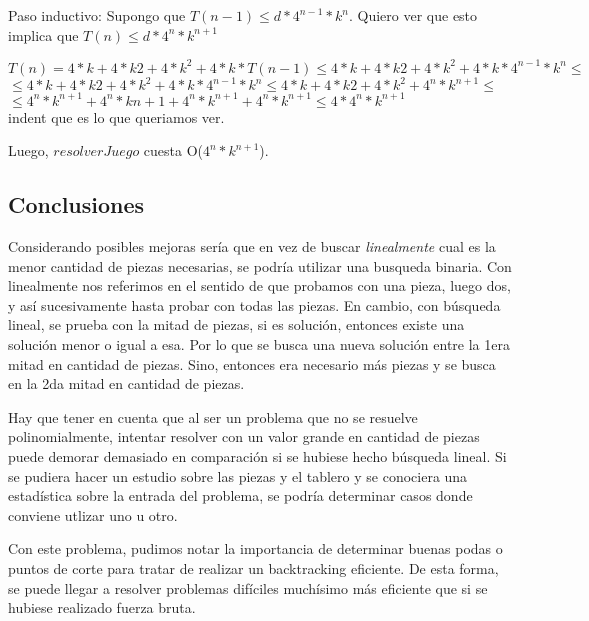 \indent Paso inductivo: Supongo  que $T(n-1) \leq  d * 4^{n-1}* k^{n}$. Quiero ver que esto implica que  $T(n) \leq  d * 4^{n}* k^{n+1}$\\

\begin{center}

\indent $T(n)= 4*k + 4*k{2} + 4*k^{2} + 4*k * T(n-1) \leq 4*k + 4*k{2} + 4*k^{2} + 4*k * 4^{n-1}* k^{n} \leq $\\
\indent $\leq 4*k + 4*k{2} + 4*k^{2} + 4*k * 4^{n-1}* k^{n} \leq 4*k + 4*k{2} + 4*k^{2} + 4^{n}* k^{n+1} \leq $ \\
\indent $\leq 4^{n}*k^{n+1} + 4^{n}*k{n+1} + 4^{n}*k^{n+1} + 4^{n}* k^{n+1} \leq 4* 4^{n}* k^{n+1}$\\
indent que es lo que queriamos ver.\\
\end{center}


\indent Luego, $resolverJuego$ cuesta O($4^{n}*k^{n+1}$).\\


\subsection{Conclusiones}

\quad Considerando posibles mejoras ser\'ia que en vez de buscar \textit{linealmente} cual es la menor cantidad de piezas necesarias, se podr\'ia utilizar una busqueda binaria. Con linealmente nos referimos en el sentido de que probamos con una pieza, luego dos, y así sucesivamente hasta probar con todas las piezas. En cambio, con b\'usqueda lineal, se prueba con la mitad de piezas, si es soluci\'on, entonces existe una soluci\'on menor o igual a esa. Por lo que se busca una nueva soluci\'on entre la 1era mitad en cantidad de piezas. Sino, entonces era necesario m\'as piezas y se busca en la 2da mitad en cantidad de piezas.

\quad Hay que tener en cuenta que al ser un problema que no se resuelve polinomialmente, intentar resolver con un valor grande en cantidad de piezas puede demorar demasiado en comparaci\'on si se hubiese hecho b\'usqueda lineal. Si se pudiera hacer un estudio sobre las piezas y el tablero y se conociera una estad\'istica sobre la entrada del problema, se podr\'ia determinar casos donde conviene utlizar uno u otro.

\quad Con este problema, pudimos notar la importancia de determinar buenas podas o puntos de corte para tratar de realizar un backtracking eficiente. De esta forma, se puede llegar a resolver problemas dif\'iciles much\'isimo m\'as eficiente que si se hubiese realizado fuerza bruta.